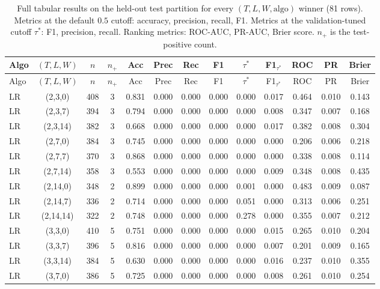\begin{longtable}{lcccccccccccc}
\caption{Full tabular results on the held-out test partition for every $(T,L,W,\text{algo})$ winner (81 rows). Metrics at the default $0.5$ cutoff: accuracy, precision, recall, F1.  Metrics at the validation-tuned cutoff $\tau^*$: F1, precision, recall.  Ranking metrics: ROC-AUC, PR-AUC, Brier score.  $n_+$ is the test-positive count.}\label{tab:v2_tabular_full}\\
\toprule
Algo & $(T,L,W)$ & $n$ & $n_+$ & Acc & Prec & Rec & F1 & $\tau^*$ & F1$_{\tau^*}$ & ROC & PR & Brier \\
\midrule
\endfirsthead
\toprule
Algo & $(T,L,W)$ & $n$ & $n_+$ & Acc & Prec & Rec & F1 & $\tau^*$ & F1$_{\tau^*}$ & ROC & PR & Brier \\
\midrule
\endhead
\bottomrule
\endfoot
LR & (2,3,0) & 408 & 3 & 0.831 & 0.000 & 0.000 & 0.000 & 0.000 & 0.017 & 0.464 & 0.010 & 0.143 \\
LR & (2,3,7) & 394 & 3 & 0.794 & 0.000 & 0.000 & 0.000 & 0.000 & 0.008 & 0.347 & 0.007 & 0.168 \\
LR & (2,3,14) & 382 & 3 & 0.668 & 0.000 & 0.000 & 0.000 & 0.000 & 0.017 & 0.382 & 0.008 & 0.304 \\
LR & (2,7,0) & 384 & 3 & 0.745 & 0.000 & 0.000 & 0.000 & 0.000 & 0.000 & 0.206 & 0.006 & 0.218 \\
LR & (2,7,7) & 370 & 3 & 0.868 & 0.000 & 0.000 & 0.000 & 0.000 & 0.000 & 0.338 & 0.008 & 0.114 \\
LR & (2,7,14) & 358 & 3 & 0.553 & 0.000 & 0.000 & 0.000 & 0.000 & 0.009 & 0.348 & 0.008 & 0.435 \\
LR & (2,14,0) & 348 & 2 & 0.899 & 0.000 & 0.000 & 0.000 & 0.001 & 0.000 & 0.483 & 0.009 & 0.087 \\
LR & (2,14,7) & 336 & 2 & 0.714 & 0.000 & 0.000 & 0.000 & 0.051 & 0.000 & 0.313 & 0.006 & 0.251 \\
LR & (2,14,14) & 322 & 2 & 0.748 & 0.000 & 0.000 & 0.000 & 0.278 & 0.000 & 0.355 & 0.007 & 0.212 \\
LR & (3,3,0) & 410 & 5 & 0.751 & 0.000 & 0.000 & 0.000 & 0.000 & 0.015 & 0.265 & 0.010 & 0.204 \\
LR & (3,3,7) & 396 & 5 & 0.816 & 0.000 & 0.000 & 0.000 & 0.000 & 0.007 & 0.201 & 0.009 & 0.165 \\
LR & (3,3,14) & 384 & 5 & 0.630 & 0.000 & 0.000 & 0.000 & 0.000 & 0.016 & 0.237 & 0.010 & 0.355 \\
LR & (3,7,0) & 386 & 5 & 0.725 & 0.000 & 0.000 & 0.000 & 0.000 & 0.008 & 0.261 & 0.010 & 0.254 \\

\end{longtable}
